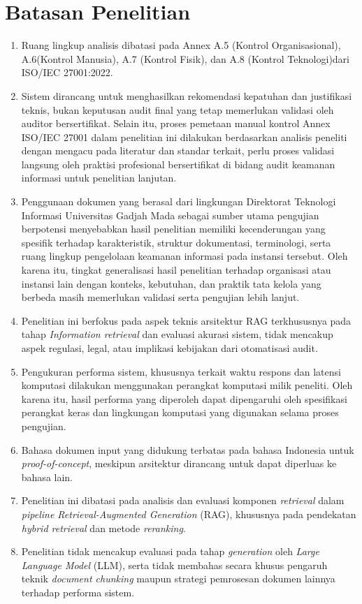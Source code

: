 \section{Batasan Penelitian}
\begin{enumerate}
	\item Ruang lingkup analisis dibatasi pada Annex A.5 (Kontrol Organisasional), A.6\break (Kontrol Manusia), A.7 (Kontrol Fisik), dan A.8 (Kontrol Teknologi)\break dari ISO/IEC 27001:2022.
	\item Sistem dirancang untuk menghasilkan rekomendasi kepatuhan dan justifikasi teknis, bukan keputusan audit final yang tetap memerlukan validasi oleh auditor bersertifikat. Selain itu, proses pemetaan manual kontrol Annex ISO/IEC 27001 dalam penelitian ini dilakukan berdasarkan analisis peneliti dengan mengacu pada literatur dan standar terkait, perlu proses validasi langsung oleh praktisi profesional bersertifikat di bidang audit keamanan informasi untuk penelitian lanjutan.
	\item Penggunaan dokumen yang berasal dari lingkungan Direktorat Teknologi Informasi Universitas Gadjah Mada sebagai sumber utama pengujian berpotensi menyebabkan hasil penelitian memiliki kecenderungan yang spesifik terhadap karakteristik, struktur dokumentasi, terminologi, serta ruang lingkup pengelolaan keamanan informasi pada instansi tersebut. Oleh karena itu, tingkat generalisasi hasil penelitian terhadap organisasi atau instansi lain dengan konteks, kebutuhan, dan praktik tata kelola yang berbeda masih memerlukan validasi serta pengujian lebih lanjut.
	\item Penelitian ini berfokus pada aspek teknis arsitektur RAG terkhususnya pada tahap \textit{Information retrieval} dan evaluasi akurasi sistem, tidak mencakup aspek regulasi, legal, atau implikasi kebijakan dari otomatisasi audit.
	\item Pengukuran performa sistem, khususnya terkait waktu respons dan latensi komputasi dilakukan menggunakan perangkat komputasi milik peneliti. Oleh karena itu, hasil performa yang diperoleh dapat dipengaruhi oleh spesifikasi perangkat keras dan lingkungan komputasi yang digunakan selama proses pengujian.
	\item Bahasa dokumen input yang didukung terbatas pada bahasa Indonesia untuk \textit{proof-of-concept}, meskipun arsitektur dirancang untuk dapat diperluas ke bahasa lain.
	\item Penelitian ini dibatasi pada analisis dan evaluasi komponen \textit{retrieval} dalam \textit{pipeline Retrieval-Augmented Generation} (RAG), khususnya pada pendekatan \textit{hybrid retrieval} dan metode \textit{reranking}.
	\item Penelitian tidak mencakup evaluasi pada tahap \textit{generation} oleh \textit{Large Language Model} (LLM), serta tidak membahas secara khusus pengaruh teknik \textit{document chunking} maupun strategi pemrosesan dokumen lainnya terhadap performa sistem.
\end{enumerate}

